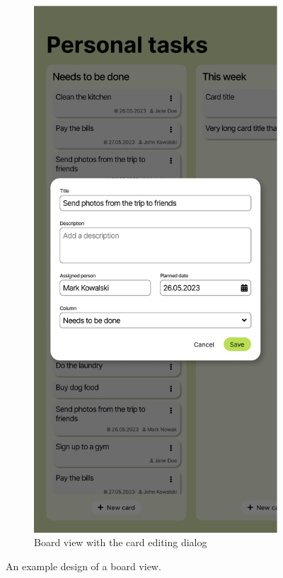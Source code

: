 \begin{figure}
    \hfill
    \begin{subfigure}[m]{0.35\textwidth}
        \centering
        \includegraphics[height=0.4\textheight]{./3-research-methodology/board-view-with-dialog}
        \caption{Board view with the card editing dialog}
        \label{fig:3-4-board-view-with-dialog}
    \end{subfigure}
    \caption{An example design of a board view.}
    \label{fig:3-4-board-view}
\end{figure}

